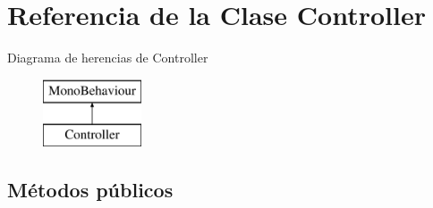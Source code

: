 \hypertarget{class_controller}{}\section{Referencia de la Clase Controller}
\label{class_controller}
Diagrama de herencias de Controller\begin{figure}[H]
\begin{center}
\leavevmode
\includegraphics[height=2.000000cm]{class_controller}
\end{center}
\end{figure}
\subsection*{Métodos públicos}
